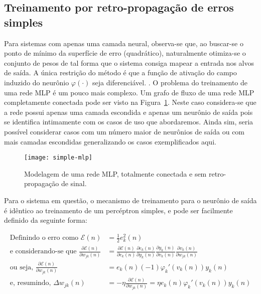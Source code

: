 \subsection{Treinamento por retro-propagação de erros simples}

Para sistemas com apenas uma camada neural, observa-se que, ao buscar-se o
ponto de mínimo da superfície de erro (quadrático), naturalmente otimiza-se o
conjunto de pesos de tal forma que o sistema consiga mapear a entrada nos
alvos de saída. A única restrição do método é que a função de ativação do
campo induzido do neurônio $\varphi(\cdot)$ seja diferenciável.
\cite{rosenblatt}. O problema do treinamento de uma rede MLP é um pouco mais
complexo. Um grafo de fluxo de uma rede MLP completamente conectada pode ser
visto na Figura~\ref{fig:simple-mlp}. Neste caso considera-se que a rede
possui apenas uma camada escondida e apenas um neurônio de saída pois se
identifica intimamente com os casos de uso que abordaremos. Ainda sim, seria
possível considerar casos com um número maior de neurônios de saída ou com
mais camadas escondidas generalizando os casos exemplificados aqui.

\begin{figure}
\begin{center}
\texttt{[image: simple-mlp]}
\end{center}
\caption{Modelagem de uma rede MLP, totalmente conectada e sem
retro-propagação de sinal.}
\label{fig:simple-mlp}
\end{figure}

Para o sistema em questão, o mecanismo de treinamento para o neurônio de saída
é idêntico ao treinamento de um percéptron simples, e pode ser facilmente
definido da seguinte forma:

\begin{align}
\text{Definindo o erro como } \mathcal{E}(n) &= \frac{1}{2}e_{k}^{2}(n)
\label{eq:error-def} \\
\text{e considerando-se que } \frac{\partial\mathcal{E}(n)}{\partial
w_{jk}(n)} &= \frac{\partial\mathcal{E}(n)}{\partial e_k(n)} \frac{\partial
e_k(n)}{\partial y_k(n)} \frac{\partial y_k(n)}{\partial v_k(n)}
\frac{\partial v_k(n)}{\partial w_{jk}(n)} \label{eq:partials} \\
\text{ou seja, } \frac{\partial\mathcal{E}(n)}{\partial
w_{jk}(n)} &= e_k(n)(-1)\varphi_{k}'(v_{k}(n))y_{k}(n)
\label{eq:partials-solution} \\
\text{e, resumindo, } \Delta w_{jk}(n) &=
-\eta\frac{\partial\mathcal{E}(n)}{\partial w_{jk}(n)} = \eta
e_{k}(n)\varphi_{k}'(v_{k}(n))y_{k}(n)
\end{align}


